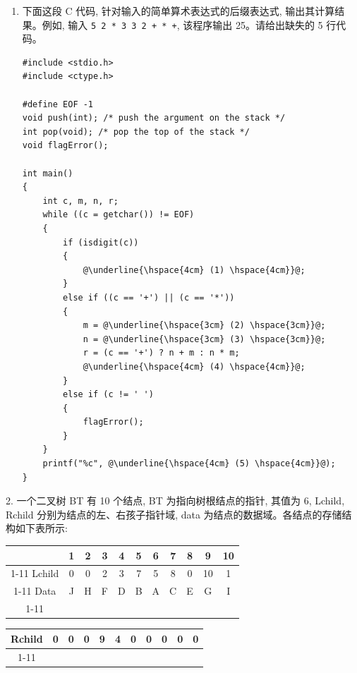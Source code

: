 \begin{enumerate}
    \item 下面这段 C 代码, 针对输入的简单算术表达式的后缀表达式, 输出其计算结果。例如, 输入 \texttt{5 2 * 3 3 2 + * +}, 该程序输出 25。请给出缺失的 5 行代码。

\begin{lstlisting}[escapechar=@]
#include <stdio.h>
#include <ctype.h>

#define EOF -1
void push(int); /* push the argument on the stack */
int pop(void); /* pop the top of the stack */
void flagError();

int main()
{
    int c, m, n, r;
    while ((c = getchar()) != EOF)
    {
        if (isdigit(c))
        {
            @\underline{\hspace{4cm} (1) \hspace{4cm}}@;
        }
        else if ((c == '+') || (c == '*'))
        {
            m = @\underline{\hspace{3cm} (2) \hspace{3cm}}@;
            n = @\underline{\hspace{3cm} (3) \hspace{3cm}}@;
            r = (c == '+') ? n + m : n * m;
            @\underline{\hspace{4cm} (4) \hspace{4cm}}@;
        }
        else if (c != ' ')
        {
            flagError();
        }
    }
    printf("%c", @\underline{\hspace{4cm} (5) \hspace{4cm}}@);
}
\end{lstlisting}
\end{enumerate}


2. 一个二叉树 BT 有 10 个结点, BT 为指向树根结点的指针, 其值为 6, Lchild, Rchild 分别为结点的左、右孩子指针域, data 为结点的数据域。各结点的存储结构如下表所示:

\begin{center}
\begin{tabular}{|c|c|c|c|c|c|c|c|c|c|c|}
\hline
\phantom{X} & 1 & 2 & 3 & 4 & 5 & 6 & 7 & 8 & 9 & 10 \\
\cline{1-11}
Lchild & 0 & 0 & 2 & 3 & 7 & 5 & 8 & 0 & 10 & 1 \\
\cline{1-11}
Data & J & H & F & D & B & A & C & E & G & I \\
\cline{1-11}
\hline
\end{tabular}
\end{center}

\begin{center}
\begin{tabular}{|c|c|c|c|c|c|c|c|c|c|c|}
\hline
Rchild & 0 & 0 & 0 & 9 & 4 & 0 & 0 & 0 & 0 & 0 \\
\cline{1-11}
\hline
\end{tabular}
\end{center}

